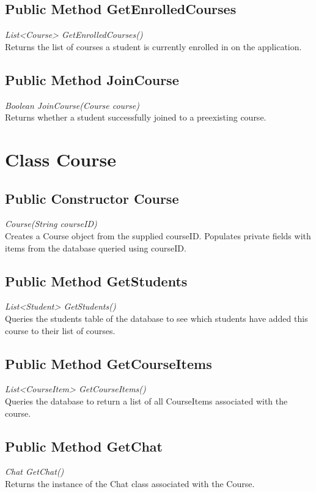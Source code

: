 \documentclass[16pt]{scrreprt}
\begin{document}
\subsection{Public Method GetEnrolledCourses}
\textit{List<Course> GetEnrolledCourses()} \\
Returns the list of courses a student is currently enrolled in on the application.

\subsection{Public Method JoinCourse}
\textit{Boolean JoinCourse(Course course)} \\
Returns whether a student successfully joined to a preexisting course.

\section{Class Course}

\subsection{Public Constructor Course}
\textit{Course(String courseID)} \\
Creates a Course object from the supplied courseID. Populates private fields with items from the database queried using courseID.

\subsection{Public Method GetStudents}
\textit{List<Student> GetStudents()} \\
Queries the students table of the database to see which students have added this course to their list of courses.

\subsection{Public Method GetCourseItems}
\textit{List<CourseItem> GetCourseItems()} \\
Queries the database to return a list of all CourseItems associated with the course.

\subsection{Public Method GetChat}
\textit{Chat GetChat()} \\
Returns the instance of the Chat class associated with the Course.
\end{document}
